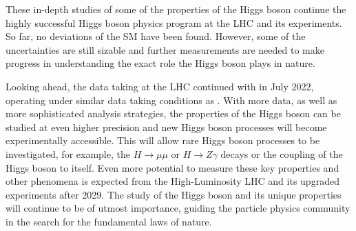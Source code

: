 These in-depth studies of some of the properties of the Higgs boson continue the highly successful Higgs boson physics program at the LHC and its experiments. 
So far, no deviations of the SM have been found. However, some of the uncertainties are still sizable and further measurements are needed to make progress in understanding the exact role the Higgs boson plays in nature. 


Looking ahead, the data taking at the LHC continued with \RunThr in July 2022, operating under similar data taking conditions as \RunTwo. 
With more data, as well as more sophisticated analysis strategies, the properties of the Higgs boson can be studied at even higher precision and new Higgs boson processes will become experimentally accessible. 
This will allow rare Higgs boson processes to be investigated, for example, the $H \to \mu\mu$ or $H \to Z\gamma$ decays or the coupling of the Higgs boson to itself.
Even more potential to measure these key properties and other phenomena is expected from the High-Luminosity LHC and its upgraded experiments after 2029.
The study of the Higgs boson and its unique properties will continue to be of utmost importance, guiding the particle physics community in the search for the fundamental laws of nature. 

